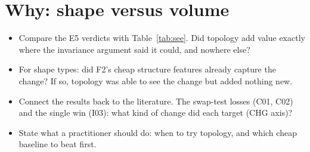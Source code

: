 \section{Why: shape versus volume}
\label{sec:why}

\begin{itemize}
  \item Compare the E5 verdicts with Table~\ref{tab:see}. Did topology add value exactly where the invariance argument said it could, and nowhere else?
  \item For shape types: did F2's cheap structure features already capture the change? If so, topology was able to see the change but added nothing new.
  \item Connect the results back to the literature. The swap-test losses (C01, C02) and the single win (I03): what kind of change did each target (CHG axis)?
  \item State what a practitioner should do: when to try topology, and which cheap baseline to beat first.
\end{itemize}
